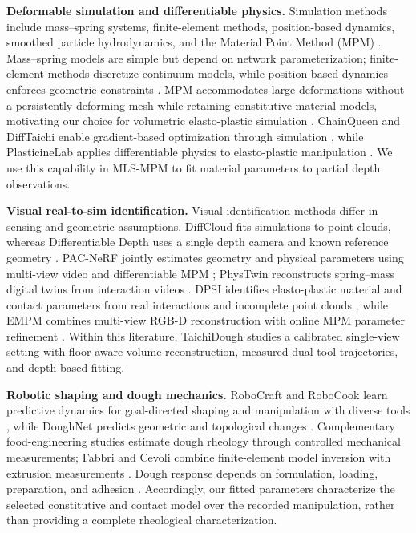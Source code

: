 \textbf{Deformable simulation and differentiable physics.}
Simulation methods include mass--spring systems, finite-element
methods, position-based dynamics, smoothed particle hydrodynamics,
and the Material Point Method (MPM)
\cite{arriola2020modeling,yin2021modeling,jiang2016mpm}.
Mass--spring models are simple but depend on network parameterization;
finite-element methods discretize continuum models, while
position-based dynamics enforces geometric constraints
\cite{arriola2020modeling}. MPM accommodates large deformations
without a persistently deforming mesh while retaining constitutive
material models, motivating our choice for volumetric elasto-plastic
simulation \cite{jiang2016mpm}.
ChainQueen and DiffTaichi enable gradient-based optimization through
simulation \cite{hu2019chainqueen,hu2020difftaichi}, while PlasticineLab
applies differentiable physics to elasto-plastic manipulation
\cite{huang2021plasticinelab}. We use this capability in MLS-MPM to
fit material parameters to partial depth observations.

\textbf{Visual real-to-sim identification.}
Visual identification methods differ in sensing and geometric
assumptions. DiffCloud fits simulations to point clouds, whereas
Differentiable Depth uses a single depth camera and known reference
geometry \cite{sundaresan2022diffcloud,arnavaz2023diffdepth}.
PAC-NeRF jointly estimates geometry and physical parameters using
multi-view video and differentiable MPM \cite{li2023pacnerf};
PhysTwin reconstructs spring--mass digital twins from interaction
videos \cite{jiang2025phystwin}. DPSI identifies elasto-plastic material
and contact parameters from real interactions and incomplete point
clouds \cite{yang2025dpsi}, while EMPM combines multi-view RGB-D
reconstruction with online MPM parameter refinement
\cite{chen2026empm}. Within this literature, TaichiDough studies a
calibrated single-view setting with floor-aware volume reconstruction,
measured dual-tool trajectories, and depth-based fitting.

\textbf{Robotic shaping and dough mechanics.}
RoboCraft and RoboCook learn predictive dynamics for goal-directed
shaping and manipulation with diverse tools
\cite{shi2022robocraft,shi2023robocook}, while DoughNet predicts
geometric and topological changes \cite{bauer2024doughnet}.
Complementary food-engineering studies estimate dough rheology through
controlled mechanical measurements; Fabbri and Cevoli combine
finite-element model inversion with extrusion measurements
\cite{fabbri2015dough}. Dough response depends on formulation,
loading, preparation, and adhesion
\cite{yazar2023doughreview,ghorbel2014adhesion}.
Accordingly, our fitted parameters characterize the selected
constitutive and contact model over the recorded manipulation,
rather than providing a complete rheological characterization.